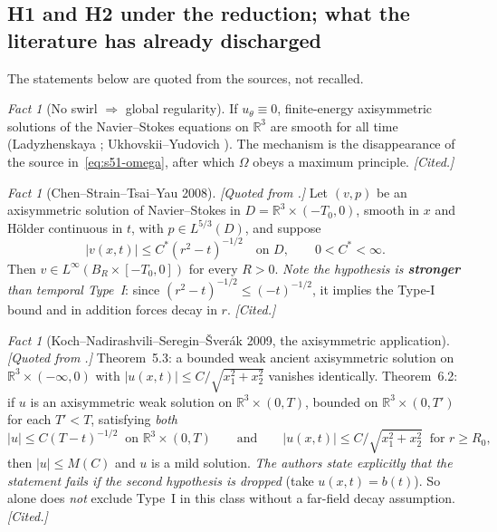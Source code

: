 \documentclass[11pt]{article}
\theoremstyle{definition}
\theoremstyle{remark}
\newtheorem{fact}[theorem]{Fact}
\newcommand{\R}{\mathbb{R}}
\begin{document}
\subsection{H1 and H2 under the reduction; what the literature has already
discharged}
\label{subsec:s51-h1h2}

The statements below are quoted from the sources, not recalled.

\begin{fact}[No swirl $\Rightarrow$ global regularity]\label{fact:s51-noswirl}
  If $u_\theta\equiv0$, finite-energy axisymmetric solutions of the
  Navier--Stokes equations on $\R^3$ are smooth for all time
  (Ladyzhenskaya \cite{Ladyzhenskaya1968}; Ukhovskii--Yudovich
  \cite{UkhovskiiYudovich1968}). The mechanism is the disappearance of the
  source in~\eqref{eq:s51-omega}, after which $\Omega$ obeys a maximum
  principle. \emph{[Cited.]}
\end{fact}

\begin{fact}[Chen--Strain--Tsai--Yau 2008]\label{fact:s51-csty}
  \emph{[Quoted from \cite[Thm.~1.1]{CSTY2008}.]} Let $(v,p)$ be an
  axisymmetric solution of Navier--Stokes in $D=\R^3\times(-T_0,0)$, smooth in
  $x$ and H\"older continuous in $t$, with $p\in L^{5/3}(D)$, and suppose
  \[
    |v(x,t)|\leq C^*(r^2-t)^{-1/2}\quad\text{on }D,
    \qquad 0<C^*<\infty .
  \]
  Then $v\in L^\infty(B_R\times[-T_0,0])$ for every $R>0$.
  \emph{Note the hypothesis is \textbf{stronger} than temporal Type~I}: since
  $(r^2-t)^{-1/2}\leq(-t)^{-1/2}$, it implies the Type-I bound and in
  addition forces decay in $r$. \emph{[Cited.]}
\end{fact}

\begin{fact}[Koch--Nadirashvili--Seregin--\v{S}ver\'ak 2009, the axisymmetric
  application]\label{fact:s51-knss-axi}
  \emph{[Quoted from \cite[Thms.~5.3, 6.1, 6.2]{KNSS2009}.]} Theorem~5.3: a
  bounded weak ancient axisymmetric solution on $\R^3\times(-\infty,0)$ with
  $|u(x,t)|\leq C/\sqrt{x_1^2+x_2^2}$ vanishes identically. Theorem~6.2: if
  $u$ is an axisymmetric weak solution on $\R^3\times(0,T)$, bounded on
  $\R^3\times(0,T')$ for each $T'<T$, satisfying \emph{both}
  \[
    |u|\leq C(T-t)^{-1/2}\ \text{ on }\R^3\times(0,T)
    \qquad\text{and}\qquad
    |u(x,t)|\leq C/\sqrt{x_1^2+x_2^2}\ \text{ for }r\geq R_0,
  \]
  then $|u|\leq M(C)$ and $u$ is a mild solution. \emph{The authors state
  explicitly that the statement fails if the second hypothesis is dropped}
  (take $u(x,t)=b(t)$). So \cite{KNSS2009} alone does \emph{not} exclude
  Type~I in this class without a far-field decay assumption.
  \emph{[Cited.]}
\end{fact}
\end{document}
